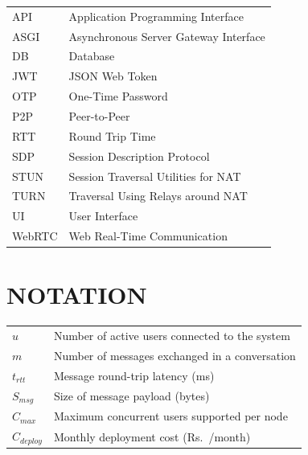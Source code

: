 \documentclass[12pt,a4paper,oneside]{report}
\newcommand{\rupee}{Rs.\ }
\begin{document}
\begin{tabularx}{\textwidth}{@{}L{3cm}X@{}}
API & Application Programming Interface \\
ASGI & Asynchronous Server Gateway Interface \\
DB & Database \\
JWT & JSON Web Token \\
OTP & One-Time Password \\
P2P & Peer-to-Peer \\
RTT & Round Trip Time \\
SDP & Session Description Protocol \\
STUN & Session Traversal Utilities for NAT \\
TURN & Traversal Using Relays around NAT \\
UI & User Interface \\
WebRTC & Web Real-Time Communication \\
\end{tabularx}

\cleardoublepage

\chapter*{NOTATION}
{}
\label{front:notation}
\thispagestyle{plain}

\begin{tabularx}{\textwidth}{@{}L{3cm}X@{}}
$u$ & Number of active users connected to the system \\
$m$ & Number of messages exchanged in a conversation \\
$t_{rtt}$ & Message round-trip latency (ms) \\
$S_{msg}$ & Size of message payload (bytes) \\
$C_{max}$ & Maximum concurrent users supported per node \\
$C_{deploy}$ & Monthly deployment cost (\rupee/month) \\
\end{tabularx}

\cleardoublepage


\end{document}
